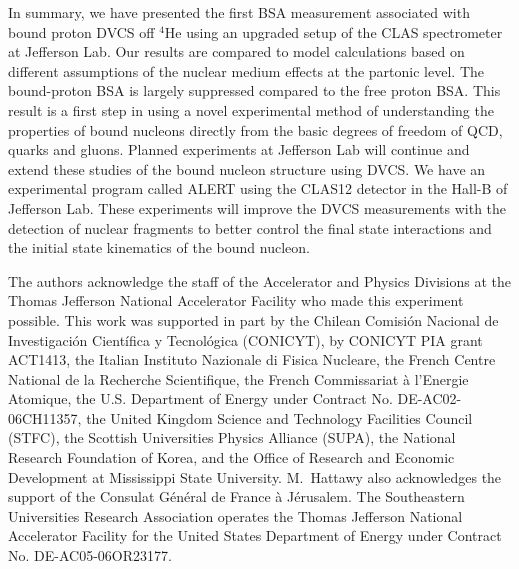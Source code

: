 \documentclass[twocolumn,nofootinbib,prl,superscriptaddress,secnumarabic,amssymb,nobibnotes,aps,floatfix]{revtex4}
\begin{document}
In summary, we have presented the first BSA measurement associated with bound 
proton DVCS off $^4$He using an upgraded setup of the CLAS spectrometer at 
Jefferson Lab. Our results are compared to model calculations based on 
different assumptions of the nuclear medium effects at the partonic level. The 
bound-proton BSA is largely suppressed compared to the free proton BSA. This 
result is a first step in using a novel experimental method of understanding 
the properties of bound nucleons directly from the basic degrees of freedom of 
QCD, quarks and gluons. Planned experiments at Jefferson Lab will continue 
and extend these studies of the bound nucleon structure using DVCS. We have an 
experimental program called ALERT using the CLAS12 detector in the Hall-B of 
Jefferson Lab. These experiments will improve the DVCS measurements with the 
detection of nuclear fragments to better control the final state interactions 
and the initial state kinematics of the bound nucleon.


The authors acknowledge the staff of the Accelerator and Physics Divisions at 
the Thomas Jefferson National Accelerator Facility who made this experiment 
possible. This work was supported in part by the Chilean Comisi\'on Nacional de 
Investigaci\'on Cient\'ifica y Tecnol\'ogica (CONICYT), by CONICYT PIA grant 
ACT1413, the Italian Instituto Nazionale di Fisica Nucleare, the French Centre 
National de la Recherche Scientifique, the French Commissariat \`a l'Energie 
Atomique, the U.S.  Department of Energy under Contract No. DE-AC02-06CH11357, 
the United Kingdom Science and Technology Facilities Council (STFC), the 
Scottish Universities Physics Alliance (SUPA), the National Research Foundation 
of Korea, and the Office of Research and Economic Development at Mississippi 
State University.  M.~Hattawy also acknowledges the support of the Consulat 
G\'en\'eral de France \`a J\'erusalem.  The Southeastern Universities Research 
Association operates the Thomas Jefferson National Accelerator Facility for the 
United States Department of Energy under Contract No. DE-AC05-06OR23177.
\end{document}
